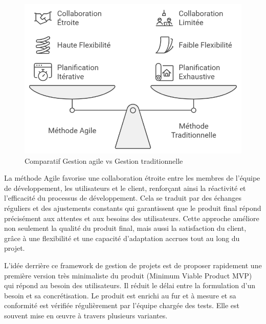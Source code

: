 \begin{figure}[H]
\begin{center}
\includegraphics[width=15cm]{assets/presentation/1_gestion_agile_vs_gestion_traditionnelle.png}
\end{center}
\caption{Comparatif Gestion agile vs Gestion traditionnelle}
\end{figure}

La méthode Agile favorise une collaboration étroite entre les membres de l’équipe de développement, les utilisateurs et le client, renforçant ainsi la réactivité et l’efficacité du processus de développement. Cela se traduit par des échanges réguliers et des ajustements constants qui garantissent que le produit final répond précisément aux attentes et aux besoins des utilisateurs. Cette approche améliore non seulement la qualité du produit final, mais aussi la satisfaction du client, grâce à une flexibilité et une capacité d’adaptation accrues tout au long du projet. 

\vspace{0.3cm}

L'idée derrière ce framework de gestion de projets est de proposer rapidement une première version très minimaliste du produit (Minimum Viable Product MVP) qui répond au besoin des utilisateurs. Il réduit le délai entre la formulation d’un besoin et sa concrétisation. Le produit est enrichi au fur et à mesure et sa conformité est vérifiée régulièrement par l'équipe chargée des tests. Elle est souvent mise en œuvre à travers plusieurs variantes.


